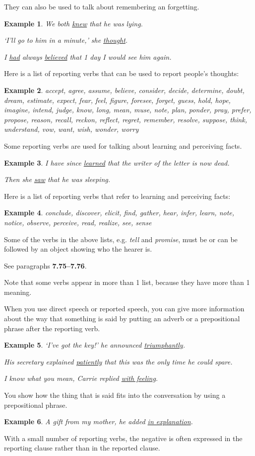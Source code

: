 \documentclass[oneside]{book}
\numberwithin{equation}{section}
\newtheorem{example}{Example}[section]
\begin{document}
They can also be used to talk about remembering an forgetting.
\begin{example}
    We both \underline{knew} that he was lying.
    
    `I'll go to him in a minute,' she \underline{thought}.
    
    I \underline{had} always \underline{believed} that 1 day I would see him again.
\end{example}
Here is a list of reporting verbs that can be used to report people's thoughts:
\begin{example}
    accept, agree, assume, believe, consider, decide, determine, doubt, dream, estimate, expect, fear, feel, figure, foresee, forget, guess, hold, hope, imagine, intend, judge, know, long, mean, muse, note, plan, ponder, pray, prefer, propose, reason, recall, reckon, reflect, regret, remember, resolve, suppose, think, understand, vow, want, wish, wonder, worry
\end{example}
%
\noindent{} Some reporting verbs are used for talking about learning and perceiving facts.
\begin{example}
    I have since \underline{learned} that the writer of the letter is now dead.
    
    Then she \underline{saw} that he was sleeping.
\end{example}
Here is a list of reporting verbs that refer to learning and perceiving facts:
\begin{example}
    conclude, discover, elicit, find, gather, hear, infer, learn, note, notice, observe, perceive, read, realize, see, sense
\end{example}
%
\noindent{} Some of the verbs in the above lists, e.g. \textit{tell} and \textit{promise}, must be or can be followed by an object showing who the hearer is.

See paragraphs \textbf{7.75--7.76}.

%
Note that some verbs appear in more than 1 list, because they have more than 1 meaning.

%
\noindent{} When you use direct speech or reported speech, you can give more information about the way that something is said by putting an adverb or a prepositional phrase after the reporting verb.
\begin{example}
    `I've got the key!' he announced \underline{triumphantly}.
    
    His secretary explained \underline{patiently} that this was the only time he could spare.
    
    I know what you mean, Carrie replied \underline{with feeling}.
\end{example}
You show how the thing that is said fits into the conversation by using a prepositional phrase.
\begin{example}
    A gift from my mother, he added \underline{in explanation}.
\end{example}
%
\noindent{} With a small number of reporting verbs, the negative is often expressed in the reporting clause rather than in the reported clause.
\end{document}
